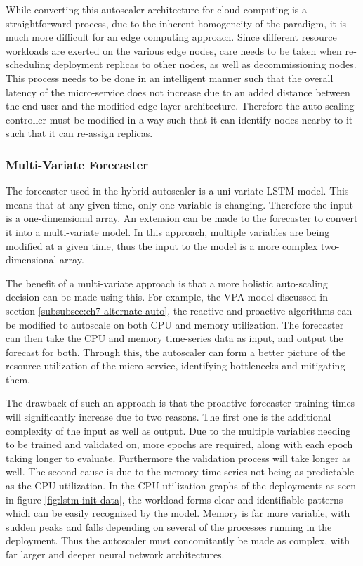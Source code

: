 While converting this autoscaler architecture for cloud computing is a straightforward process, due to the inherent homogeneity of the paradigm, it is much more difficult for an edge computing approach. Since different resource workloads are exerted on the various edge nodes, care needs to be taken when re-scheduling deployment replicas to other nodes, as well as decommissioning nodes. This process needs to be done in an intelligent manner such that the overall latency of the micro-service does not increase due to an added distance between the end user and the modified edge layer architecture. Therefore the auto-scaling controller must be modified in a way such that it can identify nodes nearby to it such that it can re-assign replicas.

\subsubsection{Multi-Variate Forecaster}
\label{subsubsec:ch7-multi-variate}

The forecaster used in the hybrid autoscaler is a uni-variate LSTM model. This means that at any given time, only one variable is changing. Therefore the input is a one-dimensional array. An extension can be made to the forecaster to convert it into a multi-variate model. In this approach, multiple variables are being modified at a given time, thus the input to the model is a more complex two-dimensional array.\par

The benefit of a multi-variate approach is that a more holistic auto-scaling decision can be made using this. For example, the VPA model discussed in section \ref{subsubsec:ch7-alternate-auto}, the reactive and proactive algorithms can be modified to autoscale on both CPU and memory utilization. The forecaster can then take the CPU and memory time-series data as input, and output the forecast for both. Through this, the autoscaler can form a better picture of the resource utilization of the micro-service, identifying bottlenecks and mitigating them.\par

The drawback of such an approach is that the proactive forecaster training times will significantly increase due to two reasons. The first one is the additional complexity of the input as well as output. Due to the multiple variables needing to be trained and validated on, more epochs are required, along with each epoch taking longer to evaluate. Furthermore the validation process will take longer as well. The second cause is due to the memory time-series not being as predictable as the CPU utilization. In the CPU utilization graphs of the deployments as seen in figure \ref{fig:lstm-init-data}, the workload forms clear and identifiable patterns which can be easily recognized by the model. Memory is far more variable, with sudden peaks and falls depending on several of the processes running in the deployment. Thus the autoscaler must concomitantly be made as complex, with far larger and deeper neural network architectures.\par

